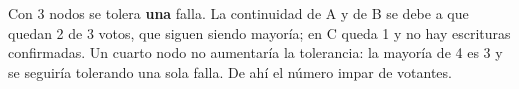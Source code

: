 \documentclass[10pt,letterpaper]{article}
\begin{document}
Con 3 nodos se tolera \textbf{una} falla. La continuidad de A y de B se debe a que quedan 2 de 3 votos, que
siguen siendo mayoría; en C queda 1 y no hay escrituras confirmadas. Un cuarto nodo no aumentaría la
tolerancia: la mayoría de 4 es 3 y se seguiría tolerando una sola falla. De ahí el número impar de votantes.
\end{document}

